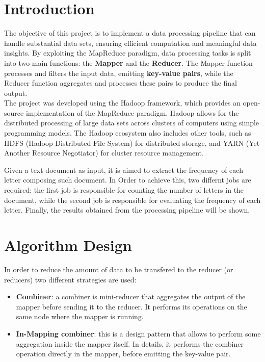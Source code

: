 \documentclass[a4paper, 12pt]{article}
\begin{document}


\tableofcontents
\newpage
\section{Introduction}
The objective of this project is to implement a data processing pipeline that can handle substantial data sets, ensuring efficient computation and meaningful data insights. By exploiting the MapReduce paradigm, data processing tasks is split into two main functions: the \textbf{Mapper} and the \textbf{Reducer}.\newline
The Mapper function processes and filters the input data, emitting \textbf{key-value pairs}, while the Reducer function aggregates and processes these pairs to produce the final output.\\

\noindent The project was developed using the Hadoop framework, which provides an open-source implementation of the MapReduce paradigm. Hadoop allows for the distributed processing of large data sets across clusters of computers using simple programming models. The Hadoop ecosystem also includes other tools, such as HDFS (Hadoop Distributed File System) for distributed storage, and YARN (Yet Another Resource Negotiator) for cluster resource management.\newline

\noindent Given a text document as input, it is aimed to extract the frequency of each letter composing such document. In Order to achieve this, two differnt jobs are required: the first job is responsible for counting the number of letters in the document, while the second job is responsible for evaluating the frequency of each letter. Finally, the results obtained from the processing pipeline will be shown.



\section{Algorithm Design}
In order to reduce the amount of data to be transfered to the reducer (or reducers) two different strategies are used:
\begin{itemize}
  \item \textbf{Combiner}: a combiner is mini-reducer that aggregates the output of the mapper before sending it to the reducer. It performs its operations on the same node where the mapper is running.
  \item \textbf{In-Mapping combiner}: this is a design pattern that allows to perform some aggregation inside the mapper itself. In details, it performs the combiner operation directly in the mapper, before emitting the key-value pair.
\end{itemize}
\end{document}
